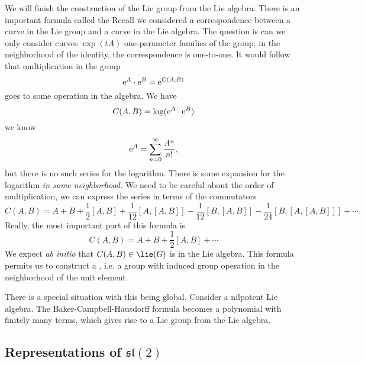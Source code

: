 We will finish the construction of the Lie group from the Lie
algebra. There is an important formula called the
 Recall we considered a
correspondence between a curve in the Lie group and a curve in
the Lie algebra. The question is can we only consider curves
$\exp(tA)$ one-parameter families of the group; in the
neighborhood of the identity, the correspondence is
one-to-one. It would follow that multiplication in the group
\begin{equation}
\mathrm{e}^{A}\cdot \mathrm{e}^{B}=\mathrm{e}^{C(A,B)}
\end{equation}
goes to some operation in the algebra. We have
\begin{equation}
C(A,B) = \log(\mathrm{e}^{A}\cdot \mathrm{e}^{B})
\end{equation}
we know
\begin{equation}
\mathrm{e}^{A}=\sum^{\infty}_{n=0}\frac{A^{n}}{n!},
\end{equation}
but there is no such series for the logarithm. There is some
expansion for the logarithm \emph{in some neighborhood.} We need
to be careful about the order of multiplication, we can express
the series in terms of the commutators
\begin{equation}
C(A,B)=A+B+\frac{1}{2}[A,B]+\frac{1}{12}[A,[A,B]]-\frac{1}{12}[B,[A,B]]-\frac{1}{24}[B,[A,[A,B]]]+\cdots.
\end{equation}
Really, the most important part of this formula is
\begin{equation}
C(A,B)=A+B+\frac{1}{2}[A,B]+\cdots
\end{equation}
We expect \emph{ab initio} that $C(A,B)\in\lie(G)$ is in the Lie
algebra. This formula permits us to construct a ,
i.e. a group with induced group operation in the neighborhood of
the unit element.

There is a special situation with this being global. Consider a
nilpotent Lie algebra. The Baker-Campbell-Hausdorff formula
becomes a polynomial with finitely many terms, which gives rise
to a Lie group from the Lie algebra.

\subsection{Representations of \texorpdfstring{$\mathfrak{sl}(2)$}{sl2}}

